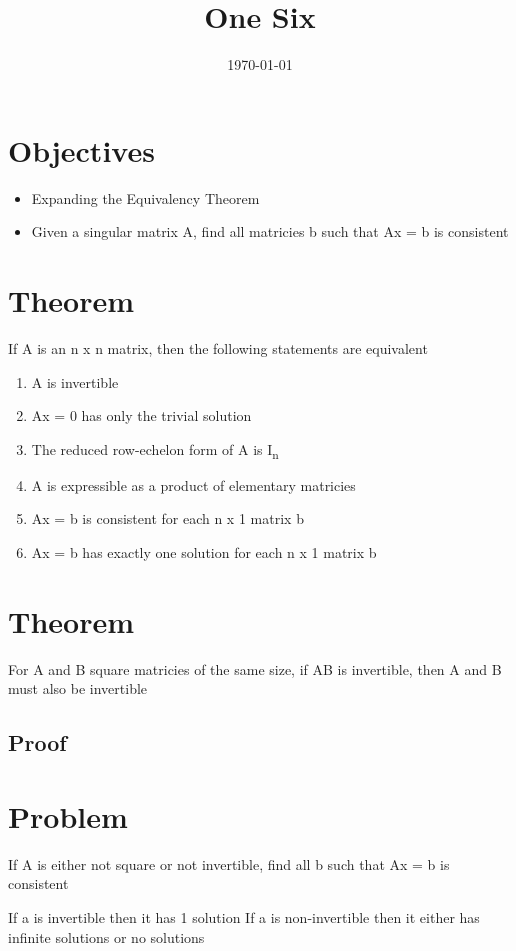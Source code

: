 \documentclass[11pt]{article}
\date{\today}
\title{One Six}
\begin{document}
\maketitle
\tableofcontents

\section{Objectives}
\label{sec:org8fb0dab}
\begin{itemize}
\item Expanding the Equivalency Theorem
\item Given a singular matrix A, find all matricies b such that Ax = b is consistent
\end{itemize}
\section{Theorem}
\label{sec:org70926f2}
If A is an n x n matrix, then the following statements are equivalent
\begin{enumerate}
\item A is invertible
\item Ax = 0 has only the trivial solution
\item The reduced row-echelon form of A is I\textsubscript{n}
\item A is expressible as a product of elementary matricies
\item Ax = b is consistent for each n x 1 matrix b
\item Ax = b has exactly one solution for each n x 1 matrix b
\end{enumerate}
\section{Theorem}
\label{sec:org8d0947f}
For A and B square matricies of the same size, if AB is invertible, then A and B must also be invertible
\subsection{Proof}
\label{sec:orga280bed}
\section{Problem}
\label{sec:org22be1ff}
If A is either not square or not invertible, find all b such that Ax = b is consistent

If a is invertible then it has 1 solution
If a is non-invertible then it either has infinite solutions or no solutions
\end{document}
